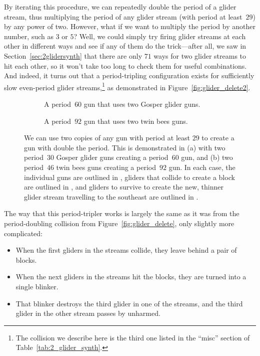 By iterating this procedure, we can repeatedly double the period of a glider stream, thus multiplying the period of any glider stream (with period at least~$29$) by any power of two. However, what if we want to multiply the period by another number, such as $3$ or $5$? Well, we could simply try firing glider streams at each other in different ways and see if any of them do the trick---after all, we saw in Section~\ref{sec:2glidersynth} that there are only $71$ ways for two glider streams to hit each other, so it won't take too long to check them for useful combinations. And indeed, it turns out that a period-tripling configuration exists for sufficiently slow even-period glider streams,\footnote{The collision we describe here is the third one listed in the ``misc'' section of Table~\ref{tab:2_glider_synth}.} as demonstrated in Figure~\ref{fig:glider_delete2}.

\begin{figure}[!htb]
	\centering
	\begin{subfigure}{.48\textwidth}
		\centering
		\caption{A period~$60$ gun that uses two Gosper glider guns.}
		\label{fig:p60_gun}
	\end{subfigure} \hfill %
	\begin{subfigure}{.49\textwidth}
		\centering
		\caption{A period~$92$ gun that uses two twin bees guns.}
		\label{fig:p92_gun}
	\end{subfigure}
	\caption{We can use two copies of any gun with period at least $29$ to create a gun with double the period. This is demonstrated in (a) with two period~$30$ Gosper glider guns creating a period~$60$ gun, and (b) two period~$46$ twin bees guns creating a period~$92$ gun. In each case, the individual guns are outlined in , gliders that collide to create a block are outlined in , and gliders to survive to create the new, thinner glider stream travelling to the southeast are outlined in .}\label{fig:guns_doubled_period}
\end{figure}

The way that this period-tripler works is largely the same as it was from the period-doubling collision from Figure~\ref{fig:glider_delete}, only slightly more complicated:\smallskip

\begin{itemize}
	\item When the first gliders in the streams collide, they leave behind a pair of blocks.\smallskip
	
	\item When the next gliders in the streams hit the blocks, they are turned into a single blinker.\smallskip
	
	\item That blinker destroys the third glider in one of the streams, and the third glider in the other stream passes by unharmed.\smallskip
\end{itemize}

